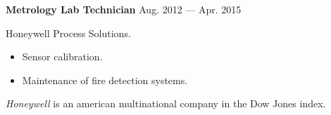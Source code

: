 \bigskip
\parbox[t][][t]{\linewidth}{
	{\parbox{\linewidth}{
		\parbox{\linewidth}{
			\textbf{Metrology Lab Technician}
			\hfill
			{Aug. 2012 --- Apr. 2015}
		}
	}}
	\smallbreak
	\parbox{\linewidth}{Honeywell Process Solutions.}
	\smallbreak
	\begin{itemize}
	    \item{Sensor calibration.}
	    \item{Maintenance of fire detection systems.}
	\end{itemize}
	\smallbreak
    \emph{Honeywell} is an american multinational company in the Dow Jones index.
}
